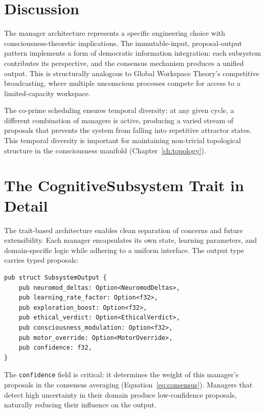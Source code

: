 \documentclass[12pt]{book}
\begin{document}
\section{Discussion}

The manager architecture represents a specific engineering choice with consciousness-theoretic implications. The immutable-input, proposal-output pattern implements a form of democratic information integration: each subsystem contributes its perspective, and the consensus mechanism produces a unified output. This is structurally analogous to Global Workspace Theory's competitive broadcasting, where multiple unconscious processes compete for access to a limited-capacity workspace.

The co-prime scheduling ensures temporal diversity: at any given cycle, a different combination of managers is active, producing a varied stream of proposals that prevents the system from falling into repetitive attractor states. This temporal diversity is important for maintaining non-trivial topological structure in the consciousness manifold (Chapter~\ref{ch:topology}).

\section{The CognitiveSubsystem Trait in Detail}

The trait-based architecture enables clean separation of concerns and future extensibility. Each manager encapsulates its own state, learning parameters, and domain-specific logic while adhering to a uniform interface. The output type carries typed proposals:

\begin{lstlisting}[caption={SubsystemOutput carries typed proposals from each manager.},label=lst:subsystem-output]
pub struct SubsystemOutput {
    pub neuromod_deltas: Option<NeuromodDeltas>,
    pub learning_rate_factor: Option<f32>,
    pub exploration_boost: Option<f32>,
    pub ethical_verdict: Option<EthicalVerdict>,
    pub consciousness_modulation: Option<f32>,
    pub motor_override: Option<MotorOverride>,
    pub confidence: f32,
}
\end{lstlisting}

The \texttt{confidence} field is critical: it determines the weight of this manager's proposals in the consensus averaging (Equation~\ref{eq:consensus}). Managers that detect high uncertainty in their domain produce low-confidence proposals, naturally reducing their influence on the output.
\end{document}
